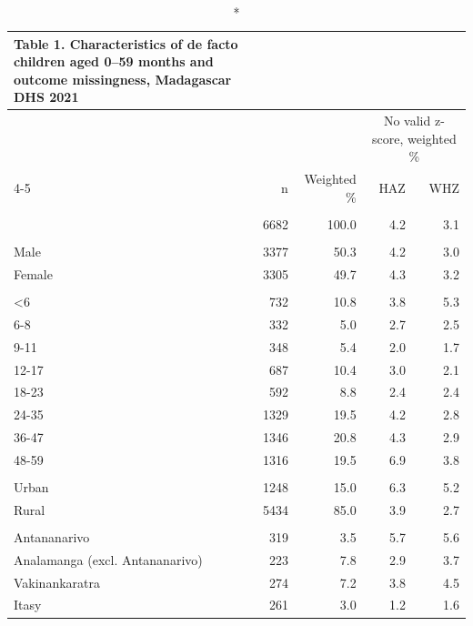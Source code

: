 \documentclass[11pt,a4paper]{article}
\begin{document}
\begingroup
\fontsize{8.0pt}{10.0pt}\selectfont
\setlength{\LTpost}{0mm}
\begin{longtable}{l|rrrr}
\caption*{
{\fontsize{20}{25}\selectfont  Table 1. Characteristics of de facto children aged 0–59 months and outcome missingness, Madagascar DHS 2021\fontsize{8}{10}\selectfont }
} \\ 
\toprule
 &  &  & \multicolumn{2}{c}{{No valid z-score, weighted \%}} \\ 
\cmidrule(lr){4-5}
 & n & Weighted \% & HAZ & WHZ \\ 
\midrule\endhead\addlinespace[2.5pt]
\multicolumn{5}{l}{All children} \\[2.5pt] 
\midrule\addlinespace[2.5pt]
 & 6682 & 100.0 & 4.2 & 3.1 \\ 
\midrule\addlinespace[2.5pt]
\multicolumn{5}{l}{Sex} \\[2.5pt] 
\midrule\addlinespace[2.5pt]
Male & 3377 & 50.3 & 4.2 & 3.0 \\ 
Female & 3305 & 49.7 & 4.3 & 3.2 \\ 
\midrule\addlinespace[2.5pt]
\multicolumn{5}{l}{Age (months)} \\[2.5pt] 
\midrule\addlinespace[2.5pt]
<6 & 732 & 10.8 & 3.8 & 5.3 \\ 
6-8 & 332 & 5.0 & 2.7 & 2.5 \\ 
9-11 & 348 & 5.4 & 2.0 & 1.7 \\ 
12-17 & 687 & 10.4 & 3.0 & 2.1 \\ 
18-23 & 592 & 8.8 & 2.4 & 2.4 \\ 
24-35 & 1329 & 19.5 & 4.2 & 2.8 \\ 
36-47 & 1346 & 20.8 & 4.3 & 2.9 \\ 
48-59 & 1316 & 19.5 & 6.9 & 3.8 \\ 
\midrule\addlinespace[2.5pt]
\multicolumn{5}{l}{Residence} \\[2.5pt] 
\midrule\addlinespace[2.5pt]
Urban & 1248 & 15.0 & 6.3 & 5.2 \\ 
Rural & 5434 & 85.0 & 3.9 & 2.7 \\ 
\midrule\addlinespace[2.5pt]
\multicolumn{5}{l}{Region} \\[2.5pt] 
\midrule\addlinespace[2.5pt]
Antananarivo & 319 & 3.5 & 5.7 & 5.6 \\ 
Analamanga (excl. Antananarivo) & 223 & 7.8 & 2.9 & 3.7 \\ 
Vakinankaratra & 274 & 7.2 & 3.8 & 4.5 \\ 
Itasy & 261 & 3.0 & 1.2 & 1.6 \\ 

\end{longtable}
\end{document}
